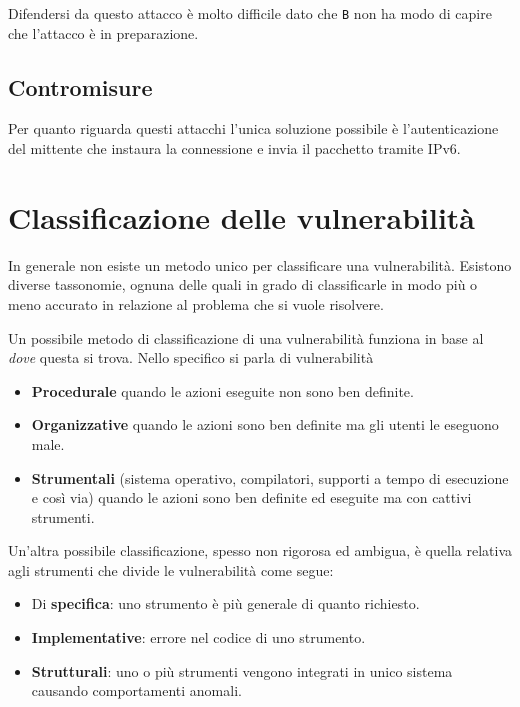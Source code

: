 Difendersi da questo attacco è molto difficile dato che \verb|B| non ha modo di capire che l'attacco è in preparazione.

\subsection{Contromisure}
Per quanto riguarda questi attacchi l'unica soluzione possibile è l'autenticazione del mittente che instaura la
connessione e invia il pacchetto tramite IPv6.

\section{Classificazione delle vulnerabilità}
In generale non esiste un metodo unico per classificare una vulnerabilità. Esistono diverse tassonomie, ognuna delle
quali in grado di classificarle in modo più o meno accurato in relazione al problema che si vuole risolvere.

Un possibile metodo di classificazione di una vulnerabilità funziona in base al \emph{dove} questa si trova. Nello
specifico si parla di vulnerabilità
\begin{itemize}
	\item \textbf{Procedurale} quando le azioni eseguite non sono ben definite.
	\item \textbf{Organizzative} quando le azioni sono ben definite ma gli utenti le eseguono male.
	\item \textbf{Strumentali} (sistema operativo, compilatori, supporti a tempo di esecuzione e così via) quando le
	      azioni sono ben definite ed eseguite ma con cattivi strumenti.
\end{itemize}

Un'altra possibile classificazione, spesso non rigorosa ed ambigua, è quella relativa agli strumenti che divide le
vulnerabilità come segue:
\begin{itemize}
	\item Di \textbf{specifica}: uno strumento è più generale di quanto richiesto.
	\item \textbf{Implementative}: errore nel codice di uno strumento.
	\item \textbf{Strutturali}: uno o più strumenti vengono integrati in unico sistema causando comportamenti anomali.
\end{itemize}

